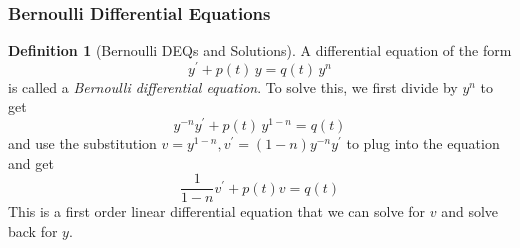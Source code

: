 \documentclass{article}
\theoremstyle{remark}
\theoremstyle{definition}
\newtheorem{definition}{Definition}[section]
\begin{document}
\subsubsection{Bernoulli Differential Equations}
\begin{definition}[Bernoulli DEQs and Solutions]
A differential equation of the form 
\[y^\prime + p(t)\,y = q(t)\, y^{n}\]
is called a \textit{Bernoulli differential equation}. To solve this, we first divide by $y^n$ to get
\[y^{-n} y^\prime + p(t)\,y^{1-n} = q(t)\]
and use the substitution $v = y^{1-n}, v^\prime = (1-n)y^{-n} y^\prime$ to plug into the equation and get
\[\frac{1}{1-n} v^\prime + p(t) v = q(t)\]
This is a first order linear differential equation that we can solve for $v$ and solve back for $y$. 
\end{definition}
\end{document}
